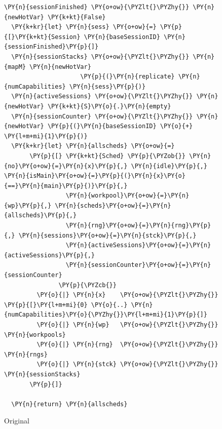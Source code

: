 \begin{figure}[t]
\begin{Verbatim}[commandchars=\\\{\}]
  \PY{n}{sessionFinished} \PY{o+ow}{\PYZlt{}\PYZhy{}} \PY{n}{newHotVar} \PY{k+kt}{False}
  \PY{k+kr}{let} \PY{n}{sess} \PY{o+ow}{=} \PY{p}{[}\PY{k+kt}{Session} \PY{n}{baseSessionID} \PY{n}{sessionFinished}\PY{p}{]}
  \PY{n}{sessionStacks} \PY{o+ow}{\PYZlt{}\PYZhy{}} \PY{n}{mapM} \PY{n}{newHotVar}
                     \PY{p}{(}\PY{n}{replicate} \PY{n}{numCapabilities} \PY{n}{sess}\PY{p}{)}
  \PY{n}{activeSessions} \PY{o+ow}{\PYZlt{}\PYZhy{}} \PY{n}{newHotVar} \PY{k+kt}{S}\PY{o}{.}\PY{n}{empty}
  \PY{n}{sessionCounter} \PY{o+ow}{\PYZlt{}\PYZhy{}} \PY{n}{newHotVar} \PY{p}{(}\PY{n}{baseSessionID} \PY{o}{+} \PY{l+m+mi}{1}\PY{p}{)}
  \PY{k+kr}{let} \PY{n}{allscheds} \PY{o+ow}{=}
       \PY{p}{[} \PY{k+kt}{Sched} \PY{p}{\PYZob{}} \PY{n}{no}\PY{o+ow}{=}\PY{n}{x}\PY{p}{,} \PY{n}{idle}\PY{p}{,} \PY{n}{isMain}\PY{o+ow}{=}\PY{p}{(}\PY{n}{x}\PY{o}{==}\PY{n}{main}\PY{p}{)}\PY{p}{,}
                 \PY{n}{workpool}\PY{o+ow}{=}\PY{n}{wp}\PY{p}{,} \PY{n}{scheds}\PY{o+ow}{=}\PY{n}{allscheds}\PY{p}{,}
                 \PY{n}{rng}\PY{o+ow}{=}\PY{n}{rng}\PY{p}{,} \PY{n}{sessions}\PY{o+ow}{=}\PY{n}{stck}\PY{p}{,}
                 \PY{n}{activeSessions}\PY{o+ow}{=}\PY{n}{activeSessions}\PY{p}{,}
                 \PY{n}{sessionCounter}\PY{o+ow}{=}\PY{n}{sessionCounter}
               \PY{p}{\PYZcb{}}
         \PY{o}{|} \PY{n}{x}    \PY{o+ow}{\PYZlt{}\PYZhy{}} \PY{p}{[}\PY{l+m+mi}{0} \PY{o}{..} \PY{n}{numCapabilities}\PY{o}{\PYZhy{}}\PY{l+m+mi}{1}\PY{p}{]}
         \PY{o}{|} \PY{n}{wp}   \PY{o+ow}{\PYZlt{}\PYZhy{}} \PY{n}{workpools}
         \PY{o}{|} \PY{n}{rng}  \PY{o+ow}{\PYZlt{}\PYZhy{}} \PY{n}{rngs}
         \PY{o}{|} \PY{n}{stck} \PY{o+ow}{\PYZlt{}\PYZhy{}} \PY{n}{sessionStacks}
       \PY{p}{]}

  \PY{n}{return} \PY{n}{allscheds}
\end{Verbatim}
    \caption*{Original}



\end{figure}
